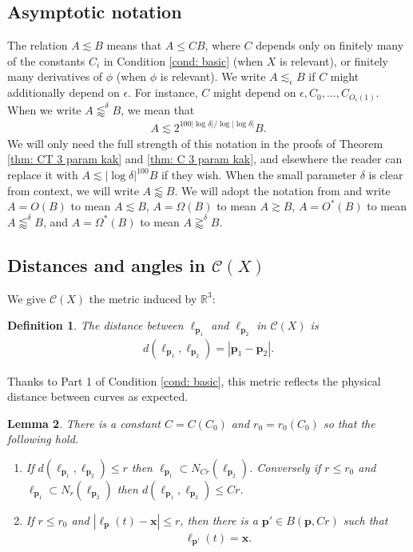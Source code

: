 \documentclass[12pt]{amsart}
\newcommand{\x}{{\bf{x}}}
\numberwithin{equation}{section}
\newtheorem{lemma}{Lemma}[section]
\newtheorem{definition}[lemma]{Definition}
\newcommand{\cC}{\mathcal C}
\renewcommand{\cC}{{\mathcal C}}
\newcommand{\R}{\mathbb{R}}
\newcommand{\1}{\mathbbm{1}}
\newcommand{\p}{\mathbf p}
\renewcommand{\x}{\mathbf x}
\begin{document}
\subsection{Asymptotic notation}
The relation $A \lesssim B$ means that $A \leq C B$, where $C$ depends only on finitely many of the constants $C_i$ in Condition \ref{cond: basic} (when $X$ is relevant), or finitely many derivatives of $\phi$ (when $\phi$ is relevant). We write $A \lesssim_\epsilon B$ if $C$ might additionally depend on $\epsilon$. For instance, $C$ might depend on $\epsilon,C_0,\ldots, C_{O_\epsilon(1)}$. When we write $A \lessapprox^\delta B$, we mean that 
\begin{align}
    A \lesssim 2^{100|\log \delta|/\log |\log \delta|} B.
\end{align}
We will only need the full strength of this notation in the proofs of Theorem \ref{thm: CT 3 param kak} and \ref{thm: C 3 param kak}, 
and elsewhere the reader can replace it with $A \lesssim |\log \delta|^{100} B$ if they wish. 
When the small parameter $\delta$ is clear from context, we will write $A \lessapprox B$. We will adopt the notation from \cite{KWZ} and write $A = O(B)$ to mean $A \lesssim B$, $A = \Omega(B)$ to mean $A \gtrsim B$, $A = O^*(B)$ to mean $A \lessapprox^\delta B$, and 
$A = \Omega^*(B)$ to mean $A \gtrapprox^\delta B$. 

\subsection{Distances and angles in $\cC(X)$}

We give $\cC(X)$ the metric induced by $\R^3$: 
\begin{definition}\label{def: metric on C(X)}
    The distance between $\ell_{\p_1}$ and $\ell_{\p_2}$ in $\cC (X)$ is 
    \begin{align}
        d(\ell_{\p_1}, \ell_{\p_2}) = |\p_1 - \p_2|. 
    \end{align}
\end{definition}
Thanks to Part 1 of Condition \ref{cond: basic}, this metric reflects the physical distance between curves as expected.
\begin{lemma}\label{lem: metric on C(X)}
    There is a constant $C = C(C_0)$ and $r_0 = r_0(C_0)$ so that the following hold. 
    \begin{enumerate}
        \item If $d(\ell_{\p_1}, \ell_{\p_2}) \leq r$ then  $\ell_{\p_1} \subset N_{Cr}(\ell_{\p_2})$. Conversely if $r \le  r_0$ and $\ell_{\p_1} \subset N_{r}(\ell_{\p_2})$ then $d(\ell_{\p_1}, \ell_{\p_2}) \leq Cr$. 
        \item If $r \leq r_0$ and $|\ell_\p(t) - \x| \leq r$, then there is a $\p' \in B(\p, Cr)$ such that 
        \begin{align}
            \ell_{\p'}(t) = \x. 
        \end{align}
    \end{enumerate}
\end{lemma}
\end{document}
